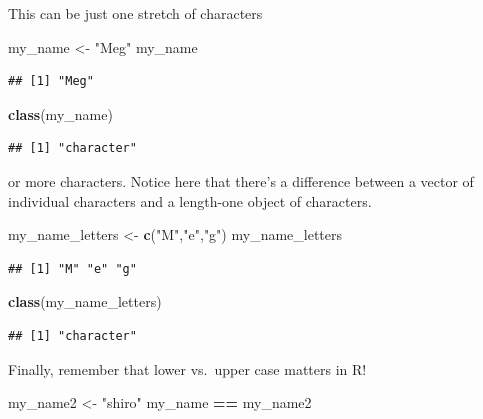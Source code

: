 \documentclass[]{book}
\newenvironment{Shaded}{\begin{snugshade}}{\end{snugshade}}
\newcommand{\KeywordTok}[1]{\textcolor[rgb]{0.13,0.29,0.53}{\textbf{#1}}}
\newcommand{\StringTok}[1]{\textcolor[rgb]{0.31,0.60,0.02}{#1}}
\newcommand{\OperatorTok}[1]{\textcolor[rgb]{0.81,0.36,0.00}{\textbf{#1}}}
\newcommand{\NormalTok}[1]{#1}
\theoremstyle{definition}
\theoremstyle{definition}
\theoremstyle{definition}
\theoremstyle{remark}
\begin{document}
This can be just one stretch of characters

\begin{Shaded}
\begin{Highlighting}[]
\NormalTok{my_name <-}\StringTok{ "Meg"}
\NormalTok{my_name}
\end{Highlighting}
\end{Shaded}

\begin{verbatim}
## [1] "Meg"
\end{verbatim}

\begin{Shaded}
\begin{Highlighting}[]
\KeywordTok{class}\NormalTok{(my_name)}
\end{Highlighting}
\end{Shaded}

\begin{verbatim}
## [1] "character"
\end{verbatim}

or more characters. Notice here that there's a difference between a
vector of individual characters and a length-one object of characters.

\begin{Shaded}
\begin{Highlighting}[]
\NormalTok{my_name_letters <-}\StringTok{  }\KeywordTok{c}\NormalTok{(}\StringTok{"M"}\NormalTok{,}\StringTok{"e"}\NormalTok{,}\StringTok{"g"}\NormalTok{)}
\NormalTok{my_name_letters}
\end{Highlighting}
\end{Shaded}

\begin{verbatim}
## [1] "M" "e" "g"
\end{verbatim}

\begin{Shaded}
\begin{Highlighting}[]
\KeywordTok{class}\NormalTok{(my_name_letters)}
\end{Highlighting}
\end{Shaded}

\begin{verbatim}
## [1] "character"
\end{verbatim}

Finally, remember that lower vs.~upper case matters in R!

\begin{Shaded}
\begin{Highlighting}[]
\NormalTok{my_name2 <-}\StringTok{ "shiro"}
\NormalTok{my_name }\OperatorTok{==}\StringTok{ }\NormalTok{my_name2}
\end{Highlighting}
\end{Shaded}
\end{document}
